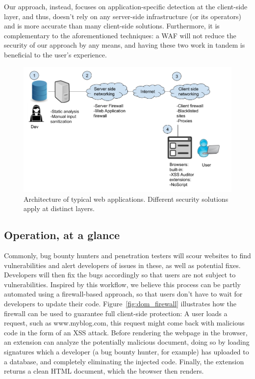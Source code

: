 Our approach, instead, focuses on application-specific detection at the client-side layer, and thus, doesn't rely on any server-side infrastructure (or its operators) and is more accurate than many client-side solutions. Furthermore, it is complementary to the aforementioned techniques: a WAF will not reduce the security of our approach by any means, and having these two work in tandem is beneficial to the user's experience.

\begin{figure}[h]
	\includegraphics[scale=0.3]{img/web_app_architecture.png}
	\caption{Architecture of typical web applications. Different security solutions apply at distinct layers.}
	\label{fig:web_architecture}
\end{figure}


\subsection{Operation, at a glance}
 Commonly, bug bounty hunters and penetration testers will scour websites to find vulnerabilities and alert developers of issues in these, as well as potential fixes. Developers will then fix the bugs accordingly so that users are not subject to vulnerabilities. Inspired by this workflow, we believe this process can be partly automated using a firewall-based approach, so that users don't have to wait for developers to update their code. Figure~\ref{fig:dom_firewall} illustrates how the firewall can be used to guarantee full client-side protection: A user loads a request, such as www.myblog.com, this request might come back with malicious code in the form of an XSS attack. Before rendering the webpage in the browser, an extension can analyze the potentially malicious document, doing so by loading signatures which a developer (a bug bounty hunter, for example) has uploaded to a database, and completely eliminating the injected code. Finally, the extension returns a clean HTML document, which the browser then renders.
 
